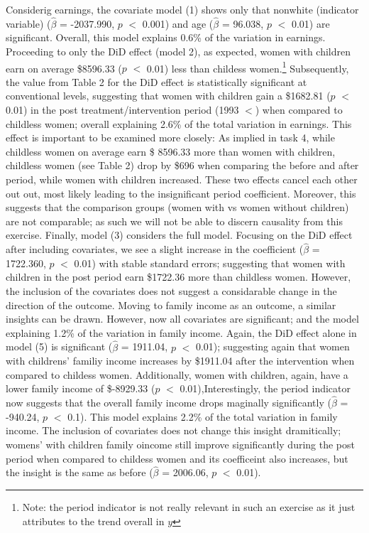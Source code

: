 \documentclass[a4paper]{article}
\begin{document}
\indent Considerig earnings, the covariate model (1) shows only that nonwhite (indicator variable) ($\hat{\beta}$ = -2037.990, $p$ $<$ 0.001) and age ($\hat{\beta}$ = 96.038, $p$ $<$ 0.01) are significant. Overall, this model explains 0.6\% of the variation in earnings. Proceeding to only the DiD effect (model 2), as expected, women with children earn on average \$8596.33 ($p$ $<$ 0.01) less than childess women.\footnote{Note: the period indicator is not really relevant in such an exercise as it just attributes to the trend overall in $y$} Subsequently, the value from Table 2 for the DiD effect is statistically significant at conventional levels, suggesting that women with children gain a \$1682.81 ($p$ $<$ 0.01) in the post treatment/intervention period (1993 $<$) when compared to childless women; overall explaining 2.6\% of the total variation in earnings. This effect is important to be examined more closely: As implied in task 4, while childless women on average earn \$ 8596.33 more than women with children, childless women (see Table 2) drop by \$696 when comparing the before and after period, while women with children increased. These two effects cancel each other out out, most likely leading to the insignificant period coefficient. Moreover, this suggests that the comparison groups (women with vs women without children) are not comparable; as such we will not be able to discern causality from this exercise. Finally, model (3) considers the full model. Focusing on the DiD effect after including covariates, we see a slight increase in the coefficient ($\hat{\beta}$ = 1722.360, $p$ $<$ 0.01) with stable standard errors; suggesting that women with children in the post period earn \$1722.36 more than childless women. However, the inclusion of the covariates does not suggest a considarable change in the direction of the outcome. 
\indent Moving to family income as an outcome, a similar insights can be drawn. However, now all covariates are significant; and the model explaining 1.2\% of the variation in family income. Again, the DiD effect alone in model (5) is significant ($\hat{\beta}$ = 1911.04, $p$ $<$ 0.01); suggesting again that women with childrens' familiy income increases by \$1911.04 after the intervention when compared to childess women. Additionally, women with children, again, have a lower family income of \$-8929.33 ($p$ $<$ 0.01),Interestingly, the period indicator now suggests that the overall family income drops maginally significantly ($\hat{\beta}$ = -940.24, $p$ $<$ 0.1). This model explains 2.2\% of the total variation in family income. The inclusion of covariates does not change this insight dramitically; womens' with children family oincome still improve significantly during the post period when compared to childess women and its coefficeint also increases, but the insight is the same as before ($\hat{\beta}$ = 2006.06, $p$ $<$ 0.01). 
\end{document}
